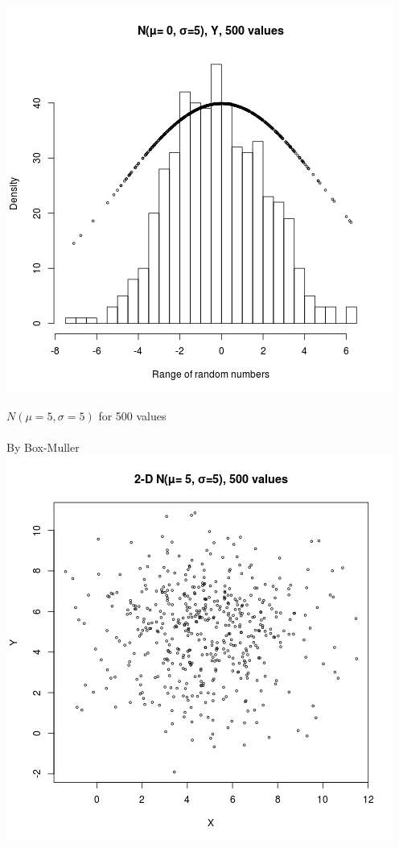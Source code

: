 \documentclass{article}
\begin{document}
\includegraphics{"plot4_1_Y"}
\pagebreak


$N(\mu= 5, \sigma=5)$ for 500 values\\\\
By Box-Muller
\includegraphics{"plot3_2"}
\pagebreak
\end{document}

